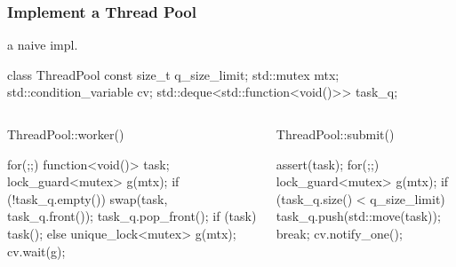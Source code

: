 \documentclass[UTF8,lualatex]{ctexbeamer}
\begin{document}
\begin{frame}[fragile]
    \frametitle{Implement a Thread Pool}
    \scriptsize
    \begin{exampleblock}{a naive impl.}
        \begin{cppcode}
            class ThreadPool {
                const size_t q_size_limit;
                std::mutex mtx;
                std::condition_variable cv;
                std::deque<std::function<void()>> task_q;
            }
        \end{cppcode}
    \end{exampleblock}
    \begin{columns}[t]
        \begin{column}{.5\textwidth}
            \begin{exampleblock}{ThreadPool::worker()}
                \tiny
                \begin{cppcode}
                    for(;;) {
                        function<void()> task;
                        {
                            lock_guard<mutex> g(mtx);
                            if (!task_q.empty()) {
                                swap(task, task_q.front());
                                task_q.pop_front();
                            }
                        }
                        if (task) {task();}
                        else {
                            unique_lock<mutex> g(mtx);
                            cv.wait(g);
                        }
                    }
                \end{cppcode}
            \end{exampleblock}
        \end{column}
        \begin{column}{.5\textwidth}
            \begin{exampleblock}{ThreadPool::submit()}
                \tiny
                \begin{cppcode}
                    assert(task);
                    for(;;) {
                        lock_guard<mutex> g(mtx);
                        if (task_q.size() < q_size_limit) {
                            task_q.push(std::move(task));
                            break;
                        }
                    }
                    cv.notify_one();
                \end{cppcode}
            \end{exampleblock}
        \end{column}
    \end{columns}
\end{frame}
\end{document}

